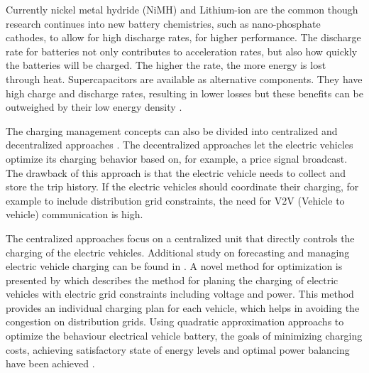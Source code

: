 Currently nickel metal hydride (NiMH) and Lithium-ion are the common though research continues into new battery chemistries, such as nano-phosphate cathodes, to allow for high discharge rates, for higher performance. The discharge rate for batteries not only contributes to acceleration rates, but also how quickly the batteries will be charged. The higher the rate, the more energy is lost through heat. Supercapacitors are available as alternative components. They have high charge and discharge rates, resulting in lower losses but these benefits can be outweighed by their low energy density \cite{ZS_coi}.

The charging management concepts can also be divided into
centralized and decentralized approaches \cite{ZS_war}. The decentralized
approaches let the electric vehicles optimize its charging behavior
based on, for example, a price signal broadcast. The drawback
of this approach is that the electric vehicle needs to collect and store the
trip history. If the electric vehicles should coordinate their charging, for
example to include distribution grid constraints, the need for
V2V (Vehicle to vehicle) communication is high. 

The centralized approaches
focus on a centralized unit that directly controls the charging of
the electric vehicles. Additional study on forecasting and managing electric vehicle
charging can be found in \cite{ZS_rah,ZS_gal}. A novel method for optimization is presented by \cite{ZS_sun} which describes the method for planing the charging of electric vehicles with electric grid constraints including voltage and power. This method provides an individual charging plan for each vehicle, which helps in avoiding the congestion on distribution grids. Using quadratic approximation approachs to optimize the behaviour  electrical vehicle battery, the goals of minimizing charging costs, achieving satisfactory state of energy levels and optimal power balancing have been achieved \cite{ZS_sun2}.


